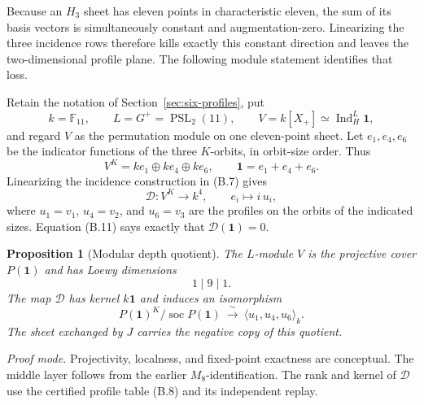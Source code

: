 \documentclass[11pt]{article}
\newtheorem{proposition}[theorem]{Proposition}
\theoremstyle{definition}
\theoremstyle{remark}
\newcommand{\F}{\mathbb{F}}
\begin{document}
Because an \(H_3\) sheet has eleven points in characteristic eleven,
the sum of its basis vectors is simultaneously constant and
augmentation-zero.  Linearizing the three incidence rows therefore
kills exactly this constant direction and leaves the two-dimensional
profile plane.  The following module statement identifies that loss.

Retain the notation of Section~\ref{sec:six-profiles}, put
\[
 k=\F_{11},\qquad L=G^+=\operatorname{PSL}_2(11),
 \qquad V=k[X_+]\simeq\operatorname{Ind}_H^L\mathbf 1,
\]
and regard $V$ as the permutation module on one eleven-point sheet.
Let $e_1,e_4,e_6$ be the indicator functions of the three $K$-orbits,
in orbit-size order.  Thus
\[
 V^K=ke_1\oplus ke_4\oplus ke_6,\qquad
 \mathbf 1=e_1+e_4+e_6.                                \tag{C.1}
\]
Linearizing the incidence construction in (B.7) gives
\[
 \mathcal D:V^K\longrightarrow k^4,\qquad
 e_i\longmapsto i\,u_i,                                \tag{C.2}
\]
where $u_1=v_1$, $u_4=v_2$, and $u_6=v_3$ are the profiles on the
orbits of the indicated sizes.
Equation (B.11) says exactly that $\mathcal D(\mathbf1)=0$.

\begin{proposition}[Modular depth quotient]
\label{prop:modular-depth-quotient}
The $L$-module $V$ is the projective cover $P(\mathbf1)$ and has
Loewy dimensions
\[
 1\mid9\mid1.
\]
The map $\mathcal D$ has kernel $k\mathbf1$ and induces an isomorphism
\[
 P(\mathbf1)^K/\operatorname{soc}P(\mathbf1)
 \ \xrightarrow{\ \sim\ }\ \langle u_1,u_4,u_6\rangle_k. \tag{C.3}
\]
The sheet exchanged by $J$ carries the negative copy of this quotient.
\end{proposition}

\noindent\emph{Proof mode.}
Projectivity, localness, and fixed-point exactness are conceptual.  The
middle layer follows from the earlier \(M_8\)-identification.  The rank and
kernel of \(\mathcal D\) use the certified profile table (B.8) and its
independent replay.
\end{document}
